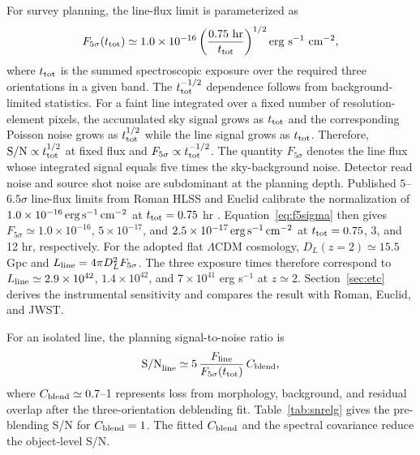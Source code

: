 For survey planning, the line-flux limit is parameterized as
\begin{equation}
  F_{5\sigma}(t_{\rm tot})\simeq
  1.0\times10^{-16}
  \left(\frac{0.75\ {\rm hr}}{t_{\rm tot}}\right)^{1/2}
  {\rm erg\ s^{-1}\ cm^{-2}},
  \label{eq:f5sigma}
\end{equation}
where $t_{\rm tot}$ is the summed spectroscopic exposure over the required three orientations in a given band. The $t_{\rm tot}^{-1/2}$ dependence follows from background-limited statistics. For a faint line integrated over a fixed number of resolution-element pixels, the accumulated sky signal grows as $t_{\rm tot}$ and the corresponding Poisson noise grows as $t_{\rm tot}^{1/2}$ while the line signal grows as $t_{\rm tot}$. Therefore, ${\rm S/N}\propto t_{\rm tot}^{1/2}$ at fixed flux and $F_{5\sigma}\propto t_{\rm tot}^{-1/2}$. The quantity $F_{5\sigma}$ denotes the line flux whose integrated signal equals five times the sky-background noise. Detector read noise and source shot noise are subdominant at the planning depth. Published $5$--$6.5\sigma$ line-flux limits from Roman HLSS and Euclid calibrate the normalization of $1.0\times10^{-16}\,{\rm erg\,s^{-1}\,cm^{-2}}$ at $t_{\rm tot}=0.75$ hr \cite{wang2021,euclid2011}. Equation~\eqref{eq:f5sigma} then gives $F_{5\sigma}\simeq1.0\times10^{-16}$, $5\times10^{-17}$, and $2.5\times10^{-17}\,{\rm erg\,s^{-1}\,cm^{-2}}$ at $t_{\rm tot}=0.75$, 3, and 12 hr, respectively. For the adopted flat $\Lambda$CDM cosmology, $D_L(z=2)\simeq15.5$ Gpc and $L_{\rm line}=4\pi D_L^2 F_{5\sigma}$. The three exposure times therefore correspond to $L_{\rm line}\simeq2.9\times10^{42}$, $1.4\times10^{42}$, and $7\times10^{41}$ erg s$^{-1}$ at $z\simeq2$. Section~\ref{sec:etc} derives the instrumental sensitivity and compares the result with Roman, Euclid, and JWST.

For an isolated line, the planning signal-to-noise ratio is
\begin{equation}
  {\rm S/N}_{\rm line}\simeq 5\,\frac{F_{\rm line}}{F_{5\sigma}(t_{\rm tot})}\,C_{\rm blend},
  \label{eq:snline}
\end{equation}
where $C_{\rm blend}\simeq0.7$--1 represents loss from morphology, background, and residual overlap after the three-orientation deblending fit. Table~\ref{tab:snrelg} gives the pre-blending S/N for $C_{\rm blend}=1$. The fitted $C_{\rm blend}$ and the spectral covariance reduce the object-level S/N.

